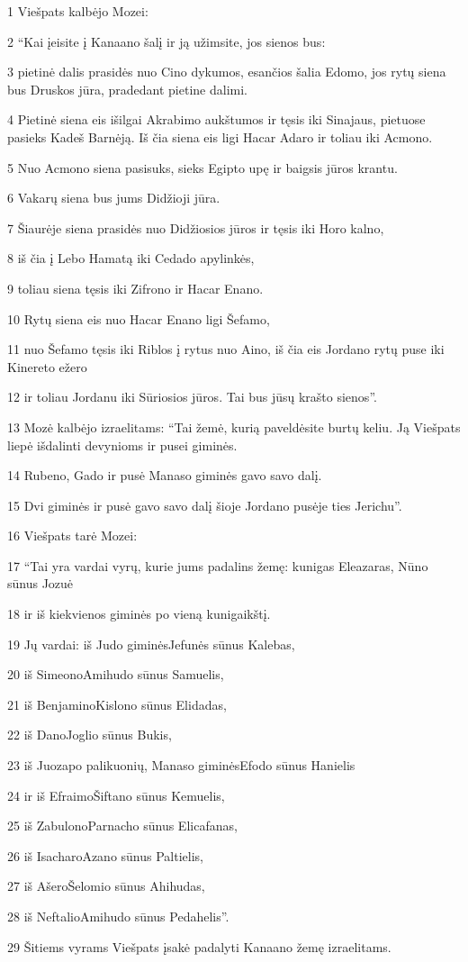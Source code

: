 \par 1 Viešpats kalbėjo Mozei: 
\par 2 “Kai įeisite į Kanaano šalį ir ją užimsite, jos sienos bus: 
\par 3 pietinė dalis prasidės nuo Cino dykumos, esančios šalia Edomo, jos rytų siena bus Druskos jūra, pradedant pietine dalimi. 
\par 4 Pietinė siena eis išilgai Akrabimo aukštumos ir tęsis iki Sinajaus, pietuose pasieks Kadeš Barnėją. Iš čia siena eis ligi Hacar Adaro ir toliau iki Acmono. 
\par 5 Nuo Acmono siena pasisuks, sieks Egipto upę ir baigsis jūros krantu. 
\par 6 Vakarų siena bus jums Didžioji jūra. 
\par 7 Šiaurėje siena prasidės nuo Didžiosios jūros ir tęsis iki Horo kalno, 
\par 8 iš čia į Lebo Hamatą iki Cedado apylinkės, 
\par 9 toliau siena tęsis iki Zifrono ir Hacar Enano. 
\par 10 Rytų siena eis nuo Hacar Enano ligi Šefamo, 
\par 11 nuo Šefamo tęsis iki Riblos į rytus nuo Aino, iš čia eis Jordano rytų puse iki Kinereto ežero 
\par 12 ir toliau Jordanu iki Sūriosios jūros. Tai bus jūsų krašto sienos”. 
\par 13 Mozė kalbėjo izraelitams: “Tai žemė, kurią paveldėsite burtų keliu. Ją Viešpats liepė išdalinti devynioms ir pusei giminės. 
\par 14 Rubeno, Gado ir pusė Manaso giminės gavo savo dalį. 
\par 15 Dvi giminės ir pusė gavo savo dalį šioje Jordano pusėje ties Jerichu”. 
\par 16 Viešpats tarė Mozei: 
\par 17 “Tai yra vardai vyrų, kurie jums padalins žemę: kunigas Eleazaras, Nūno sūnus Jozuė 
\par 18 ir iš kiekvienos giminės po vieną kunigaikštį. 
\par 19 Jų vardai: iš Judo giminės­Jefunės sūnus Kalebas, 
\par 20 iš Simeono­Amihudo sūnus Samuelis, 
\par 21 iš Benjamino­Kislono sūnus Elidadas, 
\par 22 iš Dano­Joglio sūnus Bukis, 
\par 23 iš Juozapo palikuonių, Manaso giminės­Efodo sūnus Hanielis 
\par 24 ir iš Efraimo­Šiftano sūnus Kemuelis, 
\par 25 iš Zabulono­Parnacho sūnus Elicafanas, 
\par 26 iš Isacharo­Azano sūnus Paltielis, 
\par 27 iš Ašero­Šelomio sūnus Ahihudas, 
\par 28 iš Neftalio­Amihudo sūnus Pedahelis”. 
\par 29 Šitiems vyrams Viešpats įsakė padalyti Kanaano žemę izraelitams.



